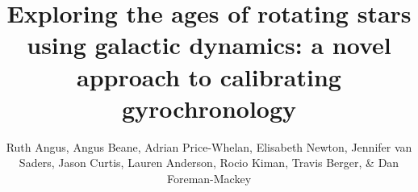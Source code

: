 \documentclass[useAMS, usenatbib, preprint, 12pt]{aastex}
\newcommand{\amnh}{1}
\newcommand{\cca}{2}
\newcommand{\hawaii}{3}
\begin{document}
\title{Exploring the ages of rotating stars using galactic dynamics: a novel
approach to calibrating gyrochronology}

\author{%
    Ruth Angus,
    Angus Beane,
    Adrian Price-Whelan,
    Elisabeth Newton,
    Jennifer van Saders,
    Jason Curtis,
    Lauren Anderson,
    Rocio Kiman,
    Travis Berger,
    \& Dan Foreman-Mackey}




\begin{abstract}
    
\end{abstract}







% 







\end{document}
